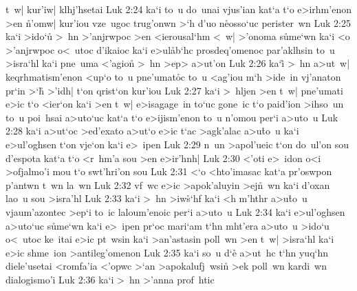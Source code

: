 t~w|
kur'iw|
klhj'hsetai\bibvsend
\vs Luk 2:24
ka`i
to~u
do~unai
vjus'ian
kat`a
t`o
e>irhm'enon
>en
\r{n}'omw|
kur'iou
vze~ugoc
trug'onwn
>`h
d'uo
n\r{e}osso`uc
perister~wn\bibvsend
\vs Luk 2:25
ka`i
>ido`u\r{}
>~hn
>'anjrwpoc
>en
<ierousal`hm
<~w|
>'onoma
s\r{u}me`wn
ka`i
<o
>'anjrwpoc
o<~utoc
d'ikaioc
ka`i
e>ul\r{a}b`hc
prosdeq'omenoc
par'aklhsin
to~u
>isra`hl
ka`i
pne~uma
<'agion\r{}
>~hn
>ep>
a>ut'on\bibvsend
\vs Luk 2:26
ka`i\r{}
>~hn
a>ut~w|
keqrhmatism'enon
<up`o
to~u
pne'umat\r{o}c
to~u
<ag'iou
m`h
>ide~in
vj'anaton
pr`in
>`h\r{}
>'idh|
t`on
qrist`on
kur'iou\bibvsend
\vs Luk 2:27
ka`i
>~hljen
>en
t~w|
pne'umati
e>ic
t`o
<ier`on
ka`i
>en
t~w|
e>isagage~in
to`uc
gone~ic
t`o
paid'ion
>ihso~un
to~u
poi~hsai
a>uto`uc
kat`a
t`o
e>ijism'enon
to~u
n'omou
per`i
a>uto~u\bibvsend
\vs Luk 2:28
ka`i
a>ut`oc
>ed'exato
a>ut`o
e>ic
t`ac
>agk'alac
a>u\r{t}o~u
ka`i
e>ul'oghsen
t`on
vje`on
ka`i
e>~ipen\bibvsend
\vs Luk 2:29
n~un
>apol'ueic
t`on
do~ul'on
sou
d'espota
kat`a
t`o
<r~hm'a
sou
>en
e>ir'hnh|\bibvsend
\vs Luk 2:30
<'oti
e>~idon
o<i
>ofjalmo'i
mou
t`o
swt'hri'on
sou\bibvsend
\vs Luk 2:31
<`o
<hto'imasac
kat`a
pr'oswpon
p'antwn
t~wn
la~wn\bibvsend
\vs Luk 2:32
vf~wc
e>ic
>apok'aluyin
>ej\r{n}~wn
ka`i
d'oxan
lao~u
sou
>isra'hl\bibvsend
\vs Luk 2:33
ka`i
>~hn
>iw\r{s}`hf
ka`i
<h
m'hthr
a>u\r{t}o~u
vjaum'azontec
>ep`i
to~ic
laloum'enoic
per`i
a>uto~u\bibvsend
\vs Luk 2:34
ka`i
e>ul'oghsen
a>uto`uc
s\r{u}me`wn
ka`i
e>~ipen
pr`oc
mari`am
t`hn
mht'era
a>uto~u
>ido`u
o<~utoc
ke~itai
e>ic
pt~wsin
ka`i
>an'astasin
poll~wn
>en
t~w|
>isra`hl
ka`i
e>ic
shme~ion
>antileg'omenon\bibvsend
\vs Luk 2:35
ka`i
so~u
d`e\r{}
a>ut~hc
t`hn
yuq`hn
diele'usetai
<romfa'ia
<'opwc
>`an
>apokalufj~wsin\r{}
>ek
poll~wn
kardi~wn
dialogismo'i\bibvsend
\vs Luk 2:36
ka`i
>~hn
>'anna
prof~htic
